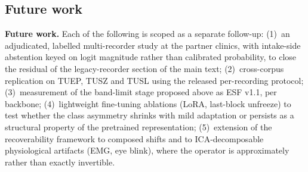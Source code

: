 \documentclass[conference]{IEEEtran}
\begin{document}
\subsection{Future work}
\textbf{Future work.}
Each of the following is scoped as a separate follow-up:
(1)~an adjudicated, labelled multi-recorder study at the partner
clinics, with intake-side abstention keyed on logit magnitude rather
than calibrated probability, to close the residual of
the legacy-recorder section of the main text;
(2)~cross-corpus replication on TUEP, TUSZ and TUSL using the released
per-recording protocol;
(3)~measurement of the band-limit stage proposed above as ESF v1.1,
per backbone;
(4)~lightweight fine-tuning ablations (LoRA, last-block unfreeze) to
test whether the class asymmetry shrinks with mild adaptation or
persists as a structural property of the pretrained representation;
(5)~extension of the recoverability framework to composed shifts and
to ICA-decomposable physiological artifacts (EMG, eye blink), where
the operator is approximately rather than exactly invertible.




\end{document}
